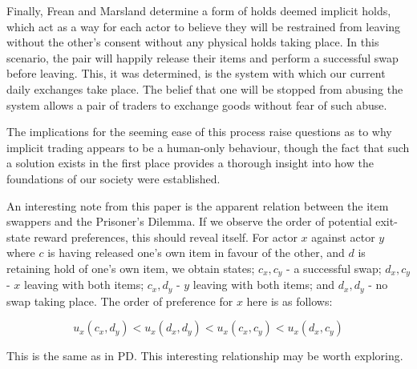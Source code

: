 Finally, Frean and Marsland determine a form of holds deemed implicit holds, which act as a way for each actor to believe they will be restrained from leaving without the other's consent without any physical holds taking place. In this scenario, the pair will happily release their items and perform a successful swap before leaving. This, it was determined, is the system with which our current daily exchanges take place. The belief that one will be stopped from abusing the system allows a pair of traders to exchange goods without fear of such abuse.

The implications for the seeming ease of this process raise questions as to why implicit trading appears to be a human-only behaviour, though the fact that such a solution exists in the first place provides a thorough insight into how the foundations of our society were established.

An interesting note from this paper is the apparent relation between the item swappers and the Prisoner's Dilemma. If we observe the order of potential exit-state reward preferences, this should reveal itself. For actor $x$ against actor $y$ where $c$ is having released one's own item in favour of the other, and $d$ is retaining hold of one's own item, we obtain states; $c_x,c_y$ - a successful swap; $d_x,c_y$ - $x$ leaving with both items; $c_x,d_y$ - $y$ leaving with both items; and $d_x,d_y$ - no swap taking place. The order of preference for $x$ here is as follows:

\[u_x(c_x,d_y) < u_x(d_x,d_y) < u_x(c_x,c_y) < u_x(d_x,c_y)\]

This is the same as in PD. This interesting relationship may be worth exploring.
